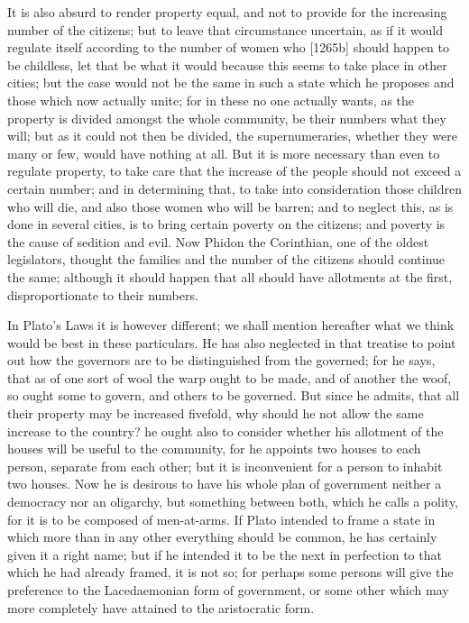 It is also absurd to render property equal, and not to provide for the
increasing number of the citizens; but to leave that circumstance
uncertain, as if it would regulate itself according to the number of women
who [1265b] should happen to be childless, let that be what it would
because this seems to take place in other cities; but the case would not
be the same in such a state which he proposes and those which now actually
unite; for in these no one actually wants, as the property is divided
amongst the whole community, be their numbers what they will; but as it
could not then be divided, the supernumeraries, whether they were many or
few, would have nothing at all. But it is more necessary than even to
regulate property, to take care that the increase of the people should not
exceed a certain number; and in determining that, to take into
consideration those children who will die, and also those women who will
be barren; and to neglect this, as is done in several cities, is to bring
certain poverty on the citizens; and poverty is the cause of sedition and
evil. Now Phidon the Corinthian, one of the oldest legislators, thought
the families and the number of the citizens should continue the same;
although it should happen that all should have allotments at the first,
disproportionate to their numbers.

In Plato's Laws it is however different; we shall mention hereafter what
we think would be best in these particulars. He has also neglected in that
treatise to point out how the governors are to be distinguished from the
governed; for he says, that as of one sort of wool the warp ought to be
made, and of another the woof, so ought some to govern, and others to be
governed. But since he admits, that all their property may be increased
fivefold, why should he not allow the same increase to the country? he
ought also to consider whether his allotment of the houses will be useful
to the community, for he appoints two houses to each person, separate from
each other; but it is inconvenient for a person to inhabit two houses. Now
he is desirous to have his whole plan of government neither a democracy
nor an oligarchy, but something between both, which he calls a polity, for
it is to be composed of men-at-arms. If Plato intended to frame a state in
which more than in any other everything should be common, he has certainly
given it a right name; but if he intended it to be the next in perfection
to that which he had already framed, it is not so; for perhaps some
persons will give the preference to the Lacedaemonian form of government,
or some other which may more completely have attained to the aristocratic
form.

